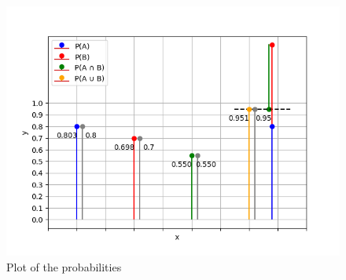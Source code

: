 \documentclass[journal]{IEEEtran}
\begin{document}
\begin{figure}[h!]
	\centering
	\includegraphics[width=1\columnwidth]{figs/simulated.png}
	\caption{Plot of the probabilities}
	\label{stemplot}
\end{figure}
\end{document}

